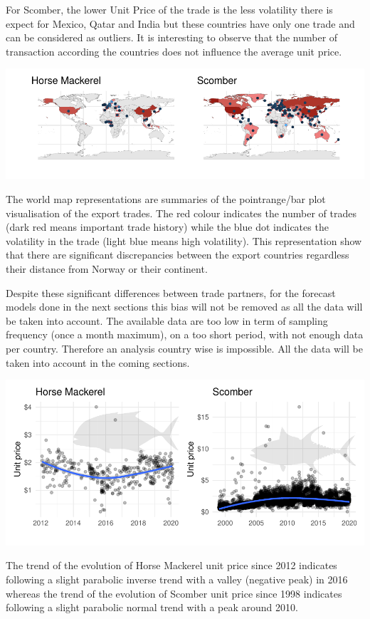 \documentclass[10,a4paperpaper,]{article}
\begin{document}
For Scomber, the lower Unit Price of the trade is the less volatility
there is expect for Mexico, Qatar and India but these countries have
only one trade and can be considered as outliers. It is interesting to
observe that the number of transaction according the countries does not
influence the average unit price.

\includegraphics{report_files/figure-latex/unnamed-chunk-2-1.pdf}

The world map representations are summaries of the pointrange/bar plot
visualisation of the export trades. The red colour indicates the number
of trades (dark red means important trade history) while the blue dot
indicates the volatility in the trade (light blue means high
volatility). This representation show that there are significant
discrepancies between the export countries regardless their distance
from Norway or their continent.

Despite these significant differences between trade partners, for the
forecast models done in the next sections this bias will not be removed
as all the data will be taken into account. The available data are too
low in term of sampling frequency (once a month maximum), on a too short
period, with not enough data per country. Therefore an analysis country
wise is impossible. All the data will be taken into account in the
coming sections.

\includegraphics{report_files/figure-latex/unnamed-chunk-3-1.pdf}

The trend of the evolution of Horse Mackerel unit price since 2012
indicates following a slight parabolic inverse trend with a valley
(negative peak) in 2016 whereas the trend of the evolution of Scomber
unit price since 1998 indicates following a slight parabolic normal
trend with a peak around 2010.
\end{document}
